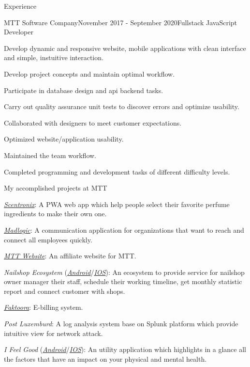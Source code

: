 \documentclass{resume}
\begin{document}
\begin{rSection}{Experience}
    \begin{rSubsection}{MTT Software Company}{November 2017 - September 2020}{Fullstack JavaScript Developer}{}
      \item Develop dynamic and responsive website, mobile applications with clean interface and simple, instuitive interaction.
      \item Develop project concepts and maintain optimal workflow.
      \item Participate in database design and api backend tasks.
      \item Carry out quality assurance unit tests to discover errors and optimize usability.
      \item Collaborated with designers to meet customer expectations.
      \item Optimized website/application usability.
      \item Maintained the team workflow.
      \item Completed programming and development tasks of different difficulty levels.
    \end{rSubsection}

    \begin{rSubsection}{}{}{My accomplished projects at MTT}{}
      \item \href{https://app.scnt.me/}{\emph{Scentronix}}: A PWA web app which help people select their favorite perfume ingredients to make their own one.
      \item \href{https://www.madlogic.nl/magic/}{\emph{Madlogic}}: A communication application for organizations that want to reach and connect all employees quickly.
      \item \href{https://mttjsc.com/}{\emph{MTT Website}}: An affiliate website for MTT.
      \item \emph{Nailshop Ecosystem} (\href{https://play.google.com/store/apps/developer?id=MTT+Software+Company+LTD/}{\emph{Android}}/\href{https://apps.apple.com/us/developer/mttjsc/id1250334932}{\emph{IOS}}): 
      An ecosystem to provide service for nailshop owner manager their
      staff, schedule their working timeline, get monthly statistic report and connect customer with shops.
      \item \href{http://app.faktoora.com}{\emph{Faktoora}}: E-billing system.
      \item \emph{Post Luxemburd}: A log analysis system base on Splunk platform which provide intuitive view for network attack.
      \item \emph{I Feel Good} (\href{https://play.google.com/store/apps/details?id=com.ifg_mobile}{\emph{Android}}/\href{}{\emph{IOS}}): 
      An utility application which highlights in a glance all the factors that have an impact on your physical and mental health.
    \end{rSubsection}
  

\end{rSection}
\end{document}
